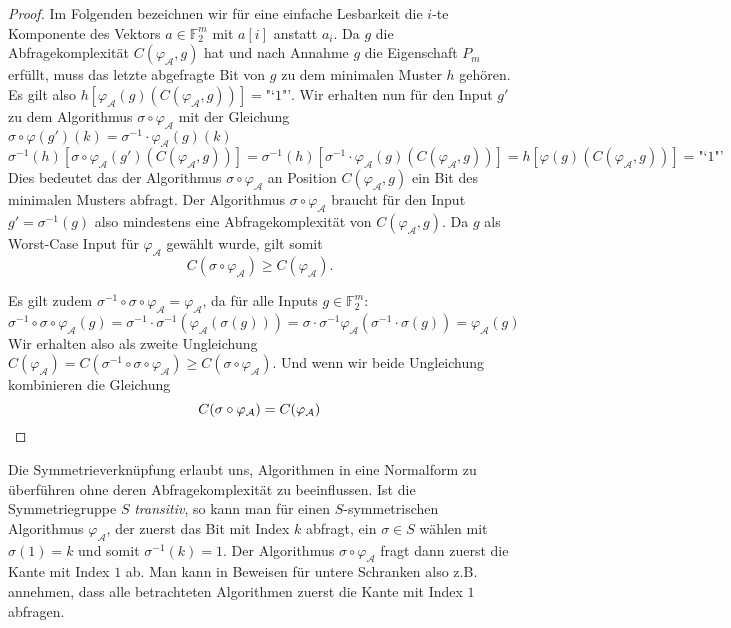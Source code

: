 \documentclass[10pt,a4paper, footheight=1mm]{scrreprt}
\theoremstyle{definition}
\begin{document}
\begin{proof}
Im Folgenden bezeichnen wir für eine einfache Lesbarkeit die
$i$-te Komponente des Vektors $a\in\mathbb{F}_2^m$ mit
$a[i]$ anstatt $a_i$.
Da $g$ die Abfragekomplexität $C(\varphi_\mathcal{A}, g)$
hat und nach Annahme $g$ die Eigenschaft $P_m$ erfüllt,
muss das letzte abgefragte Bit von $g$ zu dem
minimalen Muster $h$ gehören. Es gilt also 
$h[\varphi_\mathcal{A}(g)(C(\varphi_\mathcal{A}, g))]= \text{"`1"'}$.
Wir erhalten nun für den Input $g'$ zu dem
Algorithmus $\sigma \circ \varphi_\mathcal{A}$ mit der 
Gleichung $\sigma \circ \varphi(g')(k) = \sigma^{-1} \cdot \varphi_\mathcal{A}(g)(k)$
$$\sigma^{-1}(h)[\sigma \circ \varphi_\mathcal{A}(g')(C(\varphi_\mathcal{A}, g))]
= \sigma^{-1}(h)[\sigma^{-1} \cdot \varphi_\mathcal{A}(g)(C(\varphi_\mathcal{A}, g))]
= h[\varphi(g)(C(\varphi_\mathcal{A}, g))]
= \text{"`1"'}$$
Dies bedeutet das der Algorithmus $\sigma \circ \varphi_\mathcal{A}$ an Position
$C(\varphi_\mathcal{A}, g)$ ein Bit des minimalen Musters abfragt.
Der Algorithmus $\sigma \circ \varphi_\mathcal{A}$ braucht für den
Input $g'=\sigma^{-1}(g)$ also mindestens eine Abfragekomplexität
von $C(\varphi_\mathcal{A}, g)$. Da $g$ als Worst-Case Input für
$\varphi_\mathcal{A}$ gewählt wurde, gilt somit
$$ C(\sigma \circ \varphi_\mathcal{A}) \geq C(\varphi_\mathcal{A}).$$

Es gilt zudem 
$\sigma^{-1}\circ \sigma \circ \varphi_\mathcal{A} = \varphi_\mathcal{A}$,
da für alle Inputs $g\in\mathbb{F}_2^m$:
$$\sigma^{-1}\circ \sigma \circ \varphi_\mathcal{A}(g)
= \sigma^{-1} \cdot \sigma^{-1}(\varphi_\mathcal{A}(\sigma(g)))
= \sigma \cdot \sigma^{-1} \varphi_\mathcal{A}(\sigma^{-1}\cdot \sigma(g))
= \varphi_\mathcal{A}(g)
$$
Wir erhalten also als zweite Ungleichung
$C(\varphi_\mathcal{A}) = C(\sigma^{-1}\circ \sigma \circ \varphi_\mathcal{A})
\geq C(\sigma \circ \varphi_\mathcal{A})$.
Und wenn wir beide Ungleichung kombinieren die Gleichung
\begin{equation*}
C(\sigma \circ \varphi_\mathcal{A}) = C(\varphi_\mathcal{A})
\qedhere
\end{equation*}
\end{proof}
Die Symmetrieverknüpfung erlaubt uns, Algorithmen
in eine Normalform zu überführen ohne deren Abfragekomplexität
zu beeinflussen. 
Ist die Symmetriegruppe $S$ \emph{transitiv},
so kann man für einen $S$-symmetrischen
Algorithmus $\varphi_\mathcal{A}$, der 
zuerst das Bit mit Index $k$ abfragt,
ein $\sigma \in S$ wählen mit $\sigma(1)=k$
und somit $\sigma^{-1}(k) = 1$.
Der Algorithmus
$\sigma \circ \varphi_\mathcal{A}$ fragt dann zuerst
die Kante mit Index $1$ ab.
Man kann in Beweisen für untere Schranken also z.B. annehmen,
dass alle betrachteten Algorithmen zuerst die Kante
mit Index $1$ abfragen.
\end{document}
